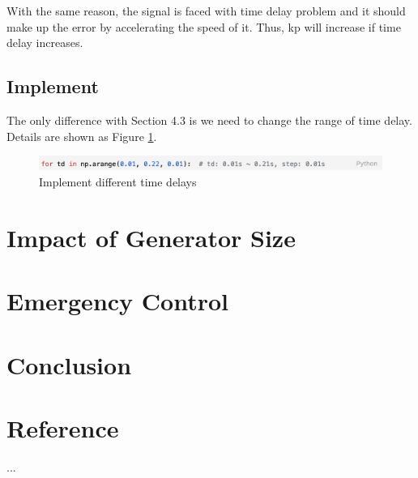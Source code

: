 \documentclass{report}
\begin{document}
With the same reason, the signal is faced with time delay problem and it should make up the error by accelerating the speed of it. Thus, kp will increase if time delay increases. \\

\section{Implement} %
The only difference with Section 4.3 is we need to change the range of time delay. Details are shown as Figure \textcolor{red}{\ref{5_3_code}}. \\

\begin{figure}[htbp]
\centering
\includegraphics[width = .819\textwidth]{figure/5_3_code.png}
\caption{Implement different time delays}
\label{5_3_code}
\end{figure}





\chapter{Impact of Generator Size}
\label{Chapter6}


\chapter{Emergency Control}
\label{Chapter7}


\chapter{Conclusion}
\label{Chapter8}


\appendix
\chapter{Reference}
...


\end{document}

